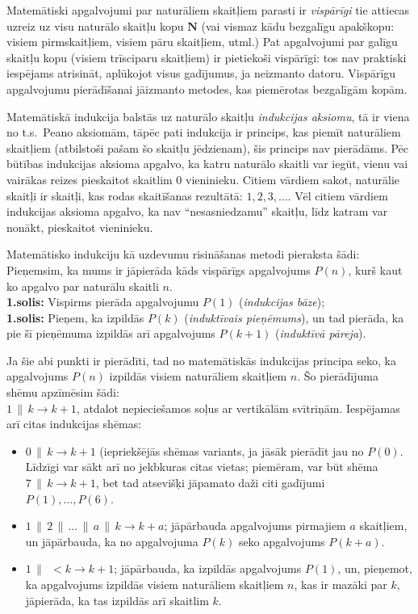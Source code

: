 \documentclass[a4paper,12pt]{article}
\begin{document}
Matemātiski apgalvojumi par naturāliem skaitļiem parasti ir {\em vispārīgi} \textendash{}
tie attiecas uzreiz uz visu naturālo skaitļu kopu $\mathbf{N}$ (vai vismaz kādu bezgalīgu apakškopu: 
visiem pirmskaitļiem, visiem pāru skaitļiem, utml.) 
Pat apgalvojumi par galīgu skaitļu kopu (visiem trīsciparu skaitļiem) ir pietiekoši vispārīgi: 
tos nav praktiski iespējams atrisināt, aplūkojot visus gadījumus, ja neizmanto datoru. 
Vispārīgu apgalvojumu pierādīšanai jāizmanto metodes, kas piemērotas bezgalīgām kopām.

Matemātiskā indukcija balstās uz naturālo skaitļu {\em indukcijas aksiomu}, tā ir viena no t.s.\
Peano aksiomām, tāpēc pati indukcija ir princips, kas piemīt naturāliem skaitļiem (atbilstoši pašam 
šo skaitļu jēdzienam), šis princips nav pierādāms.
Pēc būtības indukcijas aksioma apgalvo, ka katru naturālo skaitli var iegūt, 
vienu vai vairākas reizes pieskaitot skaitlim 0 vieninieku. 
Citiem vārdiem sakot, naturālie skaitļi ir skaitļi, kas rodas skaitīšanas rezultātā: $1,2,3,\ldots$. 
Vēl citiem vārdiem \textendash{} indukcijas aksioma apgalvo, ka nav 
``nesasniedzamu'' skaitļu, līdz katram var nonākt, pieskaitot vieninieku. 

Matemātisko indukciju kā uzdevumu risināšanas metodi pieraksta šādi:
Pieņemsim, ka mums ir jāpierāda kāds vispārīgs apgalvojums $P(n)$, kurš kaut ko apgalvo par naturālu skaitli $n$.\\
{\bf 1.solis:} Vispirms pierāda apgalvojumu $P(1)$  ({\em indukcijas bāze});\\
{\bf 1.solis:} Pieņem, ka izpildās $P(k)$ ({\em induktīvais pieņēmums}), un tad pierāda, 
ka pie šī pieņēmuma izpildās arī apgalvojums $P(k+1)$ ({\em induktīvā pāreja}).

Ja šie abi punkti ir pierādīti, tad no matemātiskās indukcijas principa seko, 
ka apgalvojums $P(n)$ izpildās visiem naturāliem skaitļiem $n$.
Šo pierādījuma shēmu apzīmēsim šādi:\\ 
$1\,\parallel\,k \rightarrow k+1$, atdalot nepieciešamos
soļus ar vertikālām svītriņām.
Iespējamas arī citas indukcijas shēmas:
\begin{itemize}
\item
$0\,\parallel\,k \rightarrow k+1$ (iepriekšējās shēmas variants, ja jāsāk pierādīt jau no $P(0)$.\\
Līdzīgi var sākt arī no jekbkuras citas vietas; piemēram, var būt shēma $7\,\parallel\,k \rightarrow k+1$, 
bet tad atsevišķi jāpamato daži citi gadījumi $P(1),\ldots,P(6)$. 
\item
$1\,\parallel\,2\,\parallel\,\ldots\,\parallel\,a\,\parallel\,k \rightarrow k+a$; 
jāpārbauda apgalvojums pirmajiem $a$ skaitļiem, un jāpārbauda, ka no apgalvojuma $P(k)$ seko apgalvojums $P(k+a)$.
\item 
$1\,\parallel\,\;<k \rightarrow k+1$; jāpārbauda, ka izpildās apgalvojums $P(1)$, un, pieņemot, 
ka apgalvojums izpildās visiem naturāliem skaitļiem $n$, kas ir mazāki par $k$, 
jāpierāda, ka tas izpildās arī skaitlim $k$.
\end{itemize}
\end{document}
